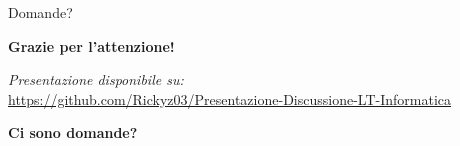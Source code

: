 \documentclass{beamer}
\begin{document}
	\begin{frame}{Domande?}
		\begin{center}
			\Large
			\textbf{Grazie per l'attenzione!}
			
			\vspace{1em}
			
			\normalsize
			\textit{Presentazione disponibile su:}\\
			\url{https://github.com/Rickyz03/Presentazione-Discussione-LT-Informatica}
			
			\vspace{2em}
			
			\Large
			\textbf{Ci sono domande?}
		\end{center}
	\end{frame}
\end{document}
